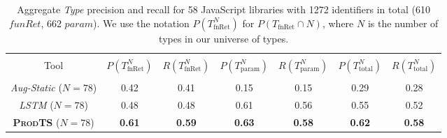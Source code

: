 \documentclass[sigplan,10pt,review,anonymous]{acmart} %
\newcommand{\prodts}{\textsc{ProdTS}\xspace}
\theoremstyle{plain}
\theoremstyle{remark}
\theoremstyle{definition}
\begin{document}
\begin{table*}[t]
  \centering
  \caption{Aggregate \textit{Type} precision and recall for 58 JavaScript libraries with 1272 identifiers in total (610 $funRet$, 662 $param$).
    We use the notation $P(T^N_\text{fnRet})$ for $P(T_\text{fnRet} \cap N)$, where $N$ is the number of types in our universe of types.}\label{tab:typeprec1}
  \begin{tabular}{ccccccc}
    \toprule                                                                                                                                                                            \\
    Tool                                & $P(T^N_\text{fnRet})$ & $R(T^N_\text{fnRet})$ & $P(T^N_\text{param})$ & $R(T^N_\text{param})$ & $P(T^N_\text{total})$ & $R(T^N_\text{total})$ \\
    \midrule                                                                                                                                                                            \\


    \textit{Aug-Static} \tiny{($N=78$)} & 0.42                  & 0.41                  & 0.15                  & 0.15                  & 0.29                  & 0.28                  \\
    \textit{LSTM} \tiny{($N=78$)}       & 0.48                  & 0.48                  & 0.61                  & 0.56                  & 0.55                  & 0.52                  \\
    \textbf{\prodts} \tiny{($N=78$)}    & \textbf{0.61}         & \textbf{0.59}         & \textbf{0.63}         & \textbf{0.58}
                                        & \textbf{0.62}         & \textbf{0.58}                                                                                                         \\
    \bottomrule
  \end{tabular}
\end{table*}
\end{document}
